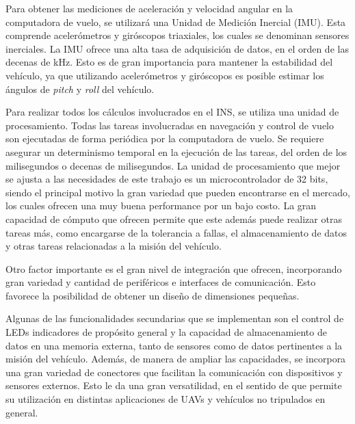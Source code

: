 
Para obtener las mediciones de aceleración y velocidad angular en la computadora de vuelo, se utilizará una Unidad de Medición Inercial (IMU). Esta comprende acelerómetros y giróscopos triaxiales, los cuales se denominan sensores inerciales. La IMU ofrece una alta tasa de adquisición de datos, en el orden de las decenas de kHz. Esto es de gran importancia para mantener la estabilidad del vehículo, ya que utilizando acelerómetros y giróscopos es posible estimar los ángulos de \textit{pitch} y \textit{roll} del vehículo. 


%

Para realizar todos los cálculos involucrados en el INS, se utiliza una unidad de procesamiento. Todas las tareas involucradas en navegación y control de vuelo son ejecutadas de forma periódica por la computadora de vuelo. Se requiere asegurar un determinismo temporal en la ejecución de las tareas, del orden de los milisegundos o decenas de milisegundos. La unidad de procesamiento que mejor se ajusta a las necesidades de este trabajo es un microcontrolador de 32 bits, siendo el principal motivo la gran variedad que pueden encontrarse en el mercado, los cuales ofrecen una muy buena performance por un bajo costo. La gran capacidad de cómputo que ofrecen permite que este además puede realizar otras tareas más, como encargarse de la tolerancia a fallas, el almacenamiento de datos y otras tareas relacionadas a la misión del vehículo.

Otro factor importante es el gran nivel de integración que ofrecen, incorporando gran variedad y cantidad de periféricos e interfaces de comunicación. Esto favorece la posibilidad de obtener un diseño de dimensiones pequeñas.

Algunas de las funcionalidades secundarias que se implementan son el control de LEDs indicadores de propósito general y la capacidad de almacenamiento de datos en una memoria externa, tanto de sensores como de datos pertinentes a la misión del vehículo. Además, de manera de ampliar las capacidades, se incorpora una gran variedad de conectores que facilitan la comunicación con dispositivos y sensores externos. Esto le da una gran versatilidad, en el sentido de que permite su utilización en distintas aplicaciones de UAVs y vehículos no tripulados en general.

